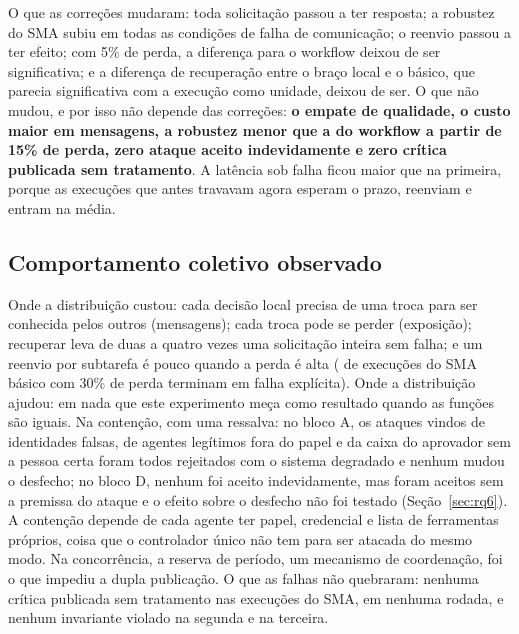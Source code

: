\documentclass[10pt,a4paper]{article}
\begin{document}
O que as correções mudaram: toda solicitação passou a ter resposta; a robustez do SMA subiu em todas as condições de
falha de comunicação; o reenvio passou a ter efeito; com 5\% de perda, a diferença para o workflow deixou de ser
significativa; e a diferença de recuperação entre o braço local e o básico, que parecia significativa com a execução como
unidade, deixou de ser. O que não mudou, e por isso não depende das correções: \textbf{o empate de qualidade, o custo
maior em mensagens, a robustez menor que a do workflow a partir de 15\% de perda, zero ataque aceito indevidamente e
zero crítica publicada sem tratamento}. A latência sob falha ficou maior que na primeira, porque as execuções que antes
travavam agora esperam o prazo, reenviam e entram na média.

\subsection{Comportamento coletivo observado}
Onde a distribuição custou: cada decisão local precisa de uma troca para ser conhecida pelos outros (mensagens); cada
troca pode se perder (exposição); recuperar leva de duas a quatro vezes uma solicitação inteira sem falha; e um reenvio
por subtarefa é pouco quando a perda é alta ( de  execuções do SMA
básico com 30\% de perda terminam em falha explícita). Onde a distribuição ajudou: em nada que este experimento meça
como resultado quando as funções são iguais. Na contenção, com uma ressalva: no bloco A, os ataques vindos de
identidades falsas, de agentes legítimos fora do papel e da caixa do aprovador sem a pessoa certa foram todos rejeitados
com o sistema degradado e nenhum mudou o desfecho; no bloco D, nenhum foi aceito indevidamente, mas
 foram aceitos sem a premissa do ataque e o efeito sobre o desfecho não foi testado
(Seção~\ref{sec:rq6}). A contenção depende de cada agente ter papel, credencial e lista de ferramentas próprios, coisa
que o controlador único não tem para ser atacada do mesmo modo. Na concorrência, a reserva de período, um mecanismo de
coordenação, foi o que impediu a dupla publicação. O que as falhas não quebraram: nenhuma crítica publicada sem
tratamento nas  execuções do SMA, em nenhuma rodada, e nenhum invariante violado na segunda e na
terceira.
\end{document}
